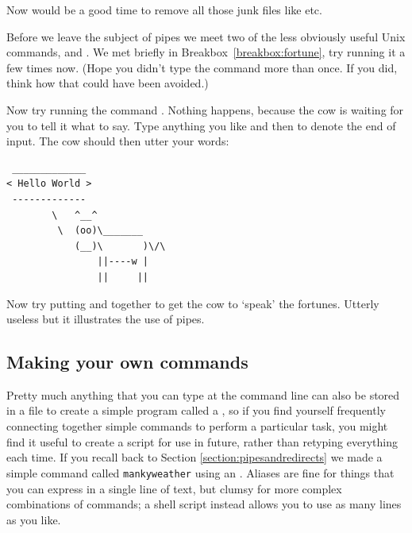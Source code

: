 Now would be a good time to remove all those junk files like  etc.

Before we leave the subject of pipes we meet two of the less obviously
useful Unix commands,  and . We met
 briefly in Breakbox~\ref{breakbox:fortune}, try
running it a few times now. (Hope you didn't type the command more
than once. If you did, think how that could have been avoided.)

Now try running the command . Nothing happens, because
the cow is waiting for you to tell it what to say. Type anything you
like and then  to denote the end of input. The cow should then
utter your words: 

\begin{verbatim}
 _____________ 
< Hello World >
 ------------- 
        \   ^__^
         \  (oo)\_______
            (__)\       )\/\
                ||----w |
                ||     ||
\end{verbatim}


Now try putting  and  together to get
the cow to `speak' the fortunes. Utterly useless but it illustrates
the use of pipes.

\subsection{Making your own commands}
\label{sec:making-your-own}

Pretty much anything that you can type at the command line can also be stored in a file to create a simple program called a , so if you find yourself frequently connecting together simple commands to perform a particular task, you might find it useful to create a script for use in future, rather than retyping everything each time. If you recall back to Section \ref{section:pipesandredirects} we made a simple command called \texttt{mankyweather} using an . Aliases are fine for things that you can express in a single line of text, but clumsy for more complex combinations of commands; a shell script instead allows you to use as many lines as you like.

